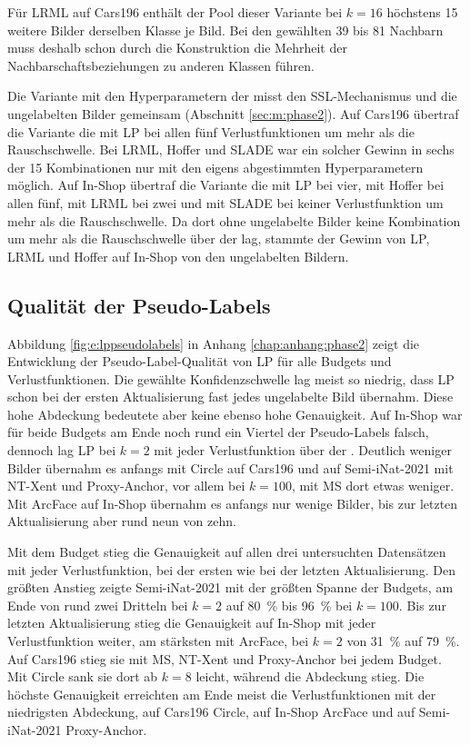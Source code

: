 Für \ac{LRML} auf Cars196 enthält der Pool dieser Variante bei $k=16$ höchstens 15 weitere Bilder derselben Klasse je Bild. Bei den gewählten 39 bis 81 Nachbarn muss deshalb schon durch die Konstruktion die Mehrheit der Nachbarschaftsbeziehungen zu anderen Klassen führen.%

Die Variante mit den Hyperparametern der \UEBL misst den \ac{SSL}-Mechanismus und die ungelabelten Bilder gemeinsam (Abschnitt \ref{sec:m:phase2}). Auf Cars196 übertraf die Variante die \UEBL mit \ac{LP} bei allen fünf Verlustfunktionen um mehr als die Rauschschwelle. Bei \ac{LRML}, Hoffer und \ac{SLADE} war ein solcher Gewinn in sechs der 15 Kombinationen nur mit den eigens abgestimmten Hyperparametern möglich. Auf In-Shop übertraf die Variante die \UEBL mit \ac{LP} bei vier, mit Hoffer bei allen fünf, mit \ac{LRML} bei zwei und mit \ac{SLADE} bei keiner Verlustfunktion um mehr als die Rauschschwelle. Da dort ohne ungelabelte Bilder keine Kombination um mehr als die Rauschschwelle über der \UEBL lag, stammte der Gewinn von \ac{LP}, \ac{LRML} und Hoffer auf In-Shop von den ungelabelten Bildern. 

\subsection{Qualität der Pseudo-Labels}
\label{sec:e:pseudolabels}

Abbildung \ref{fig:e:lppseudolabels} in Anhang \ref{chap:anhang:phase2} zeigt die Entwicklung der Pseudo-Label-Qualität von \ac{LP} für alle Budgets und Verlustfunktionen. Die gewählte Konfidenzschwelle lag meist so niedrig, dass \ac{LP} schon bei der ersten Aktualisierung fast jedes ungelabelte Bild übernahm. Diese hohe Abdeckung bedeutete aber keine ebenso hohe Genauigkeit. Auf In-Shop war für beide Budgets am Ende noch rund ein Viertel der Pseudo-Labels falsch, dennoch lag \ac{LP} bei $k=2$ mit jeder Verlustfunktion über der \UEBL. Deutlich weniger Bilder übernahm es anfangs mit Circle auf Cars196 und auf Semi-iNat-2021 mit \ac{NT-Xent} und Proxy-Anchor, vor allem bei $k=100$, mit \ac{MS} dort etwas weniger. Mit ArcFace auf In-Shop übernahm es anfangs nur wenige Bilder, bis zur letzten Aktualisierung aber rund neun von zehn.

Mit dem Budget stieg die Genauigkeit auf allen drei untersuchten Datensätzen mit jeder Verlustfunktion, bei der ersten wie bei der letzten Aktualisierung. Den größten Anstieg zeigte Semi-iNat-2021 mit der größten Spanne der Budgets, am Ende von rund zwei Dritteln bei $k=2$ auf \qty{80}{\percent} bis \qty{96}{\percent} bei $k=100$. Bis zur letzten Aktualisierung stieg die Genauigkeit auf In-Shop mit jeder Verlustfunktion weiter, am stärksten mit ArcFace, bei $k=2$ von \qty{31}{\percent} auf \qty{79}{\percent}. Auf Cars196 stieg sie mit \ac{MS}, \ac{NT-Xent} und Proxy-Anchor bei jedem Budget. Mit Circle sank sie dort ab $k=8$ leicht, während die Abdeckung stieg. Die höchste Genauigkeit erreichten am Ende meist die Verlustfunktionen mit der niedrigsten Abdeckung, auf Cars196 Circle, auf In-Shop ArcFace und auf Semi-iNat-2021 Proxy-Anchor.

